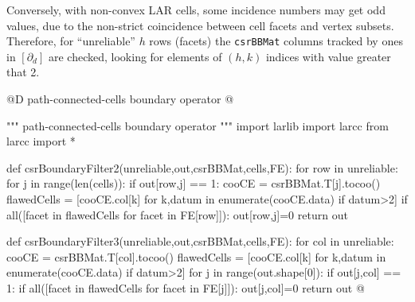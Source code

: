 \documentclass[11pt,oneside]{article}    %
\begin{document}
Conversely, with non-convex LAR cells, some incidence numbers may get odd values, due to the non-strict coincidence between cell facets and vertex subsets.
Therefore, for ``unreliable'' $h$ rows (facets) the \texttt{csrBBMat} columns tracked by ones in $[\partial_d]$ are checked, looking for elements of $(h,k)$ indices with value greater that 2.

@D path-connected-cells boundary operator
@{""" path-connected-cells boundary operator """
import larlib
import larcc
from larcc import *

def csrBoundaryFilter2(unreliable,out,csrBBMat,cells,FE):
    for row in unreliable:
        for j in range(len(cells)):
            if out[row,j] == 1:
                cooCE = csrBBMat.T[j].tocoo()
                flawedCells = [cooCE.col[k] for k,datum in enumerate(cooCE.data)
                    if datum>2]
                if all([facet in flawedCells  for facet in FE[row]]):
                    out[row,j]=0
    return out

def csrBoundaryFilter3(unreliable,out,csrBBMat,cells,FE):
    for col in unreliable:
        cooCE = csrBBMat.T[col].tocoo()
        flawedCells = [cooCE.col[k] for k,datum in enumerate(cooCE.data)
                    if datum>2]
        for j in range(out.shape[0]):
            if out[j,col] == 1:
                if all([facet in flawedCells  for facet in FE[j]]):
                    out[j,col]=0
    return out
@}
\end{document}
